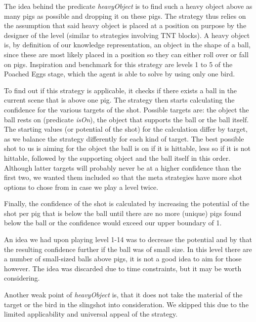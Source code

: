 The idea behind the predicate \emph{heavyObject} is to find such a heavy object above as many pigs as possible and dropping it on these pigs. The strategy thus relies on the assumption that said heavy object is placed at a position on purpose by the designer of the level (similar to strategies involving TNT blocks). A heavy object is, by definition of our knowledge representation, an object in the shape of a ball, since these are most likely placed in a position so they can either roll over or fall on pigs. Inspiration and benchmark for this strategy are levels 1 to 5 of the Poached Eggs stage, which the agent is able to solve by using only one bird.

To find out if this strategy is applicable, it checks if there exists a ball in the current scene that is above one pig. The strategy then starts calculating the confidence for the various targets of the shot. Possible targets are: the object the ball rests on (predicate \emph{isOn}), the object that supports the ball or the ball itself. The starting values (or potential of the shot) for the calculation differ by target, as we balance the strategy differently for each kind of target. The best possible shot to us is aiming for the object the ball is on if it is hittable, less so if it is not hittable, followed by the supporting object and the ball itself in this order. Although latter targets will probably never be at a higher confidence than the first two, we wanted them included so that the meta strategies have more shot options to chose from in case we play a level twice.

Finally, the confidence of the shot is calculated by increasing the potential of the shot per pig that is below the ball until there are no more (unique) pigs found below the ball or the confidence would exceed our upper boundary of 1.

An idea we had upon playing level 1-14 was to decrease the potential and by that the resulting confidence further if the ball was of small size. In this level there are a number of small-sized balls above pigs, it is not a good idea to aim for those however. The idea was discarded due to time constraints, but it may be worth considering.

Another weak point of \emph{heavyObject} is, that it does not take the material of the target or the bird in the slingshot into consideration. We skipped this due to the limited applicability and universal appeal of the strategy.
